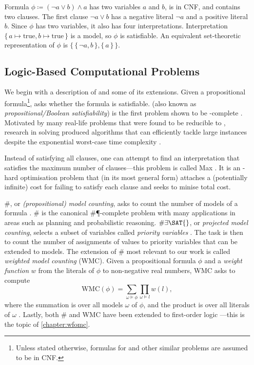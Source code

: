 \begin{example} \label{example:logic}
  Formula $\phi \coloneqq (\neg a \lor b) \land a$ has two variables $a$ and $b$, is in CNF, and contains two clauses. The first clause $\neg a \lor b$ has a negative literal $\neg a$ and a positive literal $b$. Since $\phi$ has two variables, it also has four interpretations. Interpretation $\{\, a \mapsto \text{true}, b \mapsto \text{true} \,\}$ is a model, so $\phi$ is satisfiable. An equivalent set-theoretic representation of $\phi$ is $\{\, \{\, \neg a, b \,\}, \{\, a \,\} \,\}$.
\end{example}

\subsection{Logic-Based Computational Problems} \label{sec:logicproblems}

We begin with a description of \SAT{} and some of its extensions. Given a propositional formula\footnote{Unless stated otherwise, formulas for \SAT{} and other similar problems are assumed to be in CNF.}, \SAT{} asks whether the formula is satisfiable. \SAT{} (also known as \emph{propositional/Boolean satisfiability}) is the first problem shown to be \NP-complete \citep{DBLP:conf/stoc/Cook71,levin1973universal}. Motivated by many real-life problems that were found to be reducible to \SAT{}, research in \SAT{} solving produced algorithms that can efficiently tackle large instances despite the exponential worst-case time complexity \citep{DBLP:series/faia/2009-185}.

Instead of satisfying all clauses, one can attempt to find an interpretation that satisfies the maximum number of clauses---this problem is called Max\SAT{} \citep{bacchus2021maximum,DBLP:series/faia/LiM09}. It is an \NP-hard optimisation problem that (in its most general form) attaches a (potentially infinite) cost for failing to satisfy each clause and seeks to minise total cost.

\#\SAT{}, or \emph{(propositional) model counting}, asks to count the number of models of a formula \citep{DBLP:series/faia/GomesSS09}. \#\SAT{} is the canonical \#\P-complete problem with many applications in areas such as planning and probabilistic reasoning. $\#\exists\SAT{}$, or \emph{projected model counting}, selects a subset of variables called \emph{priority variables} \citep{DBLP:conf/sat/AzizCMS15}. The task is then to count the number of assignments of values to priority variables that can be extended to models. The extension of \#\SAT{} most relevant to our work is called \emph{weighted model counting} (WMC). Given a propositional formula $\phi$ and a \emph{weight function} $w$ from the literals of $\phi$ to non-negative real numbers, WMC asks to compute
\[
\mathrm{WMC}(\phi) = \sum_{\omega \models \phi} \prod_{\omega \models l} w(l),
\]
where the summation is over all models $\omega$ of $\phi$, and the product is over all literals of $\omega$ \citep{DBLP:journals/ai/ChaviraD08}. Lastly, both \#\SAT{} and WMC have been extended to first-order logic \citep{DBLP:conf/ijcai/BroeckTMDR11}---this is the topic of \cref{chapter:wfomc}.

